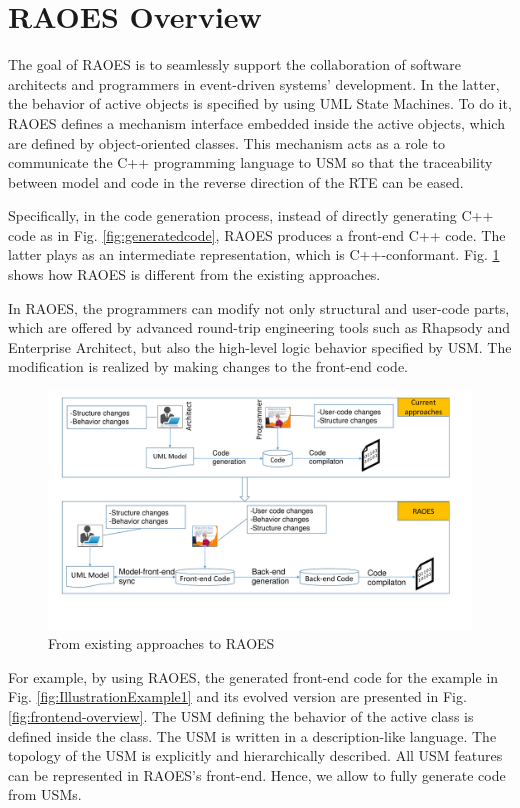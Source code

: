 \section{RAOES Overview}
\label{sec:overview}
The goal of RAOES is to seamlessly support the collaboration of software architects and programmers in event-driven systems' development.
In the latter, the behavior of active objects is specified by using UML State Machines.
To do it, RAOES defines a mechanism interface embedded inside the active objects, which are defined by object-oriented classes. 
This mechanism acts as a role to communicate the C++ programming language to USM so that the traceability between model and code in the reverse direction of the RTE can be eased.

Specifically, in the code generation process, instead of directly generating C++ code as in Fig. \ref{fig:generatedcode}, RAOES produces a front-end C++ code.
The latter plays as an intermediate representation, which is C++-conformant.
Fig. \ref{fig:raoes} shows how RAOES is different from the existing approaches.

In RAOES, the programmers can modify not only structural and user-code parts, which are offered by advanced round-trip engineering tools such as Rhapsody and Enterprise Architect, but also the high-level logic behavior specified by USM.
The modification is realized by making changes to the front-end code.


\begin{figure}[h]
	\centering
	\includegraphics[clip, trim=0.6cm 2.8cm 1.4cm 0.5cm, width=1.0\columnwidth]{figures/frontend}
	\caption{From existing approaches to RAOES} 
	\label{fig:raoes}
\end{figure}

For example, by using RAOES, the generated front-end code for the example in Fig. \ref{fig:IllustrationExample1} and its evolved version are presented in Fig. \ref{fig:frontend-overview}.
The USM defining the behavior of the active class  is defined inside the class.
The USM is written in a description-like language.
The topology of the USM is explicitly and hierarchically described.
All USM features can be represented in RAOES's front-end.
Hence, we allow to fully generate code from USMs.

